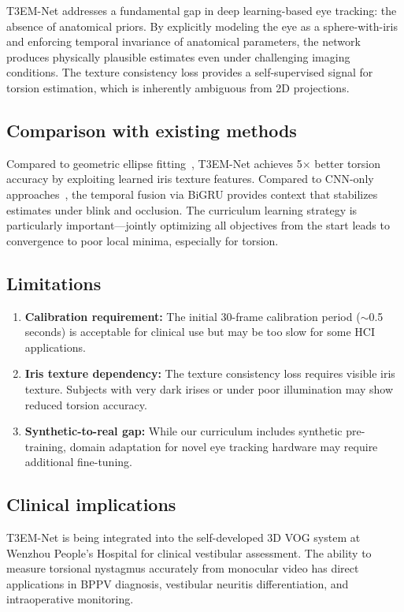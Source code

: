 \documentclass[review]{elsarticle}
\begin{document}
T3EM-Net addresses a fundamental gap in deep learning-based eye tracking: the absence of anatomical priors. By explicitly modeling the eye as a sphere-with-iris and enforcing temporal invariance of anatomical parameters, the network produces physically plausible estimates even under challenging imaging conditions. The texture consistency loss provides a self-supervised signal for torsion estimation, which is inherently ambiguous from 2D projections.

\subsection{Comparison with existing methods}

Compared to geometric ellipse fitting~\cite{Swirski2012}, T3EM-Net achieves 5$\times$ better torsion accuracy by exploiting learned iris texture features. Compared to CNN-only approaches~\cite{Fuhl2021,Khan2019}, the temporal fusion via BiGRU provides context that stabilizes estimates under blink and occlusion. The curriculum learning strategy is particularly important---jointly optimizing all objectives from the start leads to convergence to poor local minima, especially for torsion.

\subsection{Limitations}
\label{sec:limitations}

\begin{enumerate}
    \item \textbf{Calibration requirement:} The initial 30-frame calibration period ($\sim$0.5 seconds) is acceptable for clinical use but may be too slow for some HCI applications.
    \item \textbf{Iris texture dependency:} The texture consistency loss requires visible iris texture. Subjects with very dark irises or under poor illumination may show reduced torsion accuracy.
    \item \textbf{Synthetic-to-real gap:} While our curriculum includes synthetic pre-training, domain adaptation for novel eye tracking hardware may require additional fine-tuning.
\end{enumerate}

\subsection{Clinical implications}

T3EM-Net is being integrated into the self-developed 3D VOG system at Wenzhou People's Hospital for clinical vestibular assessment. The ability to measure torsional nystagmus accurately from monocular video has direct applications in BPPV diagnosis, vestibular neuritis differentiation, and intraoperative monitoring.
\end{document}
